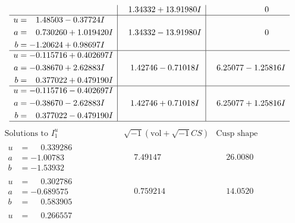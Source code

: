 \documentclass[1p]{elsarticle_modified}
\theoremstyle{definition}
\newcommand{\I}{\sqrt{-1}}
\begin{document}
$$\begin{array}{c|c|c}
 & \phantom{-}1.34332 + 13.91980 I & \phantom{-0.000000 } 0 \\ \hline\begin{aligned}
u &= \phantom{-}1.48503 - 0.37724 I \\
a &= \phantom{-}0.730260 + 1.019420 I \\
b &= -1.20624 + 0.98697 I\end{aligned}
 & \phantom{-}1.34332 - 13.91980 I & \phantom{-0.000000 } 0 \\ \hline\begin{aligned}
u &= -0.115716 + 0.402697 I \\
a &= -0.38670 + 2.62883 I \\
b &= \phantom{-}0.377022 + 0.479190 I\end{aligned}
 & \phantom{-}1.42746 - 0.71018 I & \phantom{-}6.25077 - 1.25816 I \\ \hline\begin{aligned}
u &= -0.115716 - 0.402697 I \\
a &= -0.38670 - 2.62883 I \\
b &= \phantom{-}0.377022 - 0.479190 I\end{aligned}
 & \phantom{-}1.42746 + 0.71018 I & \phantom{-}6.25077 + 1.25816 I\\
 \hline 
 \end{array}$$\newpage$$\begin{array}{c|c|c}  
\text{Solutions to }I^u_{1}& \I (\text{vol} + \sqrt{-1}CS) & \text{Cusp shape}\\
 \hline 
\begin{aligned}
u &= \phantom{-}0.339286\phantom{ +0.000000I} \\
a &= -1.00783\phantom{ +0.000000I} \\
b &= -1.53932\phantom{ +0.000000I}\end{aligned}
 & \phantom{-}7.49147\phantom{ +0.000000I} & \phantom{-}26.0080\phantom{ +0.000000I} \\ \hline\begin{aligned}
u &= \phantom{-}0.302786\phantom{ +0.000000I} \\
a &= -0.689575\phantom{ +0.000000I} \\
b &= \phantom{-}0.583905\phantom{ +0.000000I}\end{aligned}
 & \phantom{-}0.759214\phantom{ +0.000000I} & \phantom{-}14.0520\phantom{ +0.000000I} \\ \hline\begin{aligned}
u &= \phantom{-}0.266557\phantom{ +0.000000I} \\

\end{aligned}
\end{array}$$
\end{document}

